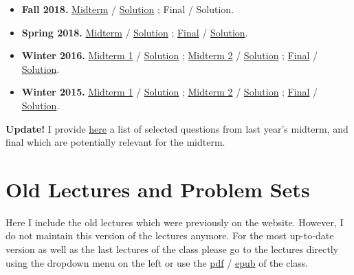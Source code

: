 \documentclass[]{book}
\providecommand{\tightlist}{%
  \setlength{\itemsep}{0pt}\setlength{\parskip}{0pt}}
\theoremstyle{definition}
\theoremstyle{definition}
\theoremstyle{definition}
\theoremstyle{remark}
\begin{document}
\begin{itemize}
\tightlist
\item
  \textbf{Fall 2018.} \href{past-exams/2018F-midterm.pdf}{Midterm} /
  \href{past-exams/2018F-midterm-solution.pdf}{Solution} ; Final /
  Solution.\\
\item
  \textbf{Spring 2018.} \href{past-exams/2018S-midterm.pdf}{Midterm} /
  \href{past-exams/2018S-midterm-solution.pdf}{Solution} ;
  \href{past-exams/2018S-final.pdf}{Final} /
  \href{past-exams/2018S-final-solution.pdf}{Solution}.\\
\item
  \textbf{Winter 2016.} \href{past-exams/2016W-midterm1.pdf}{Midterm 1}
  / \href{past-exams/2016W-midterm1-solution.pdf}{Solution} ;
  \href{past-exams/2016W-midterm2.pdf}{Midterm 2} /
  \href{past-exams/2016W-midterm2-solution.pdf}{Solution} ;
  \href{past-exams/2016W-final.pdf}{Final} /
  \href{past-exams/2016W-final-solution.pdf}{Solution}.\\
\item
  \textbf{Winter 2015.} \href{past-exams/2015W-midterm1.pdf}{Midterm 1}
  / \href{past-exams/2015W-midterm1-solution.pdf}{Solution} ;
  \href{past-exams/2015W-midterm2.pdf}{Midterm 2} /
  \href{past-exams/2015W-midterm2-solution.pdf}{Solution} ;
  \href{past-exams/2015W-final.pdf}{Final} /
  \href{past-exams/2015W-final-solution.pdf}{Solution}.
\end{itemize}

\textbf{Update!} I provide \href{past-exams.html}{here} a list of
selected questions from last year's midterm, and final which are
potentially relevant for the midterm.

\section*{Old Lectures and Problem
Sets}\label{old-lectures-and-problem-sets}

Here I include the old lectures which were previously on the website.
However, I do not maintain this version of the lectures anymore. For the
most up-to-date version as well as the last lectures of the class please
go to the lectures directly using the dropdown menu on the left or use
the \href{ucla-102-fall2018.pdf}{pdf} /
\href{ucla-102-fall2018.epub}{epub} of the class.
\end{document}
